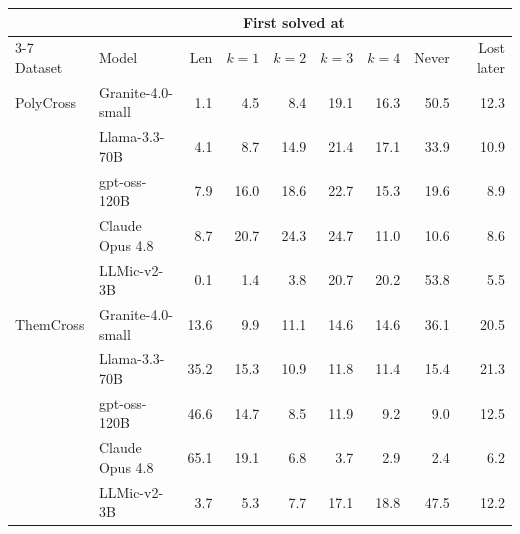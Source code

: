 \begin{tabular}{llrrrrrrr}
\toprule
 & & \multicolumn{5}{c}{First solved at} & & \\
\cmidrule(lr){3-7}
Dataset & Model & Len & $k{=}1$ & $k{=}2$ & $k{=}3$ & $k{=}4$ & Never & Lost later \\
\midrule
PolyCross & Granite-4.0-small & 1.1 & 4.5 & 8.4 & 19.1 & 16.3 & 50.5 & 12.3 \\
 & Llama-3.3-70B & 4.1 & 8.7 & 14.9 & 21.4 & 17.1 & 33.9 & 10.9 \\
 & gpt-oss-120B & 7.9 & 16.0 & 18.6 & 22.7 & 15.3 & 19.6 & 8.9 \\
 & Claude Opus 4.8 & 8.7 & 20.7 & 24.3 & 24.7 & 11.0 & 10.6 & 8.6 \\
 & LLMic-v2-3B & 0.1 & 1.4 & 3.8 & 20.7 & 20.2 & 53.8 & 5.5 \\
\midrule
ThemCross & Granite-4.0-small & 13.6 & 9.9 & 11.1 & 14.6 & 14.6 & 36.1 & 20.5 \\
 & Llama-3.3-70B & 35.2 & 15.3 & 10.9 & 11.8 & 11.4 & 15.4 & 21.3 \\
 & gpt-oss-120B & 46.6 & 14.7 & 8.5 & 11.9 & 9.2 & 9.0 & 12.5 \\
 & Claude Opus 4.8 & 65.1 & 19.1 & 6.8 & 3.7 & 2.9 & 2.4 & 6.2 \\
 & LLMic-v2-3B & 3.7 & 5.3 & 7.7 & 17.1 & 18.8 & 47.5 & 12.2 \\
\bottomrule
\end{tabular}
